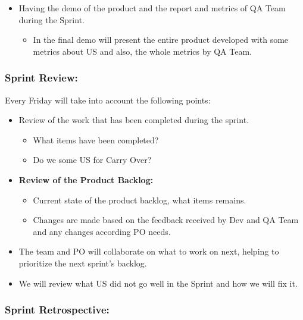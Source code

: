 \begin{itemize}
\tightlist
\item
  Having the demo of the product and the report and metrics of QA Team
  during the Sprint.

  \begin{itemize}
  \tightlist
  \item
    In the final demo will present the entire product developed with
    some metrics about US and also, the whole metrics by QA Team.
  \end{itemize}
\end{itemize}

\hypertarget{sprintreview}{
\subsubsection{Sprint Review:}\label{sprintreview}}

Every Friday will take into account the following points:

\begin{itemize}
\tightlist
\item
  Review of the work that has been completed during the sprint.

  \begin{itemize}
  \tightlist
  \item
    What items have been completed?
  \item
    Do we some US for Carry Over?
  \end{itemize}
\item
  \textbf{Review of the Product Backlog:}

  \begin{itemize}
  \tightlist
  \item
    Current state of the product backlog, what items remains.
  \item
    Changes are made based on the feedback received by Dev and QA Team
    and any changes according PO needs.
  \end{itemize}
\item
  The team and PO will collaborate on what to work on next, helping to
  prioritize the next sprint's backlog.
\item
  We will review what US did not go well in the Sprint and how we will
  fix it.
\end{itemize}

\hypertarget{sprintretrospective}{
\subsubsection{Sprint Retrospective:}\label{sprintretrospective}}

